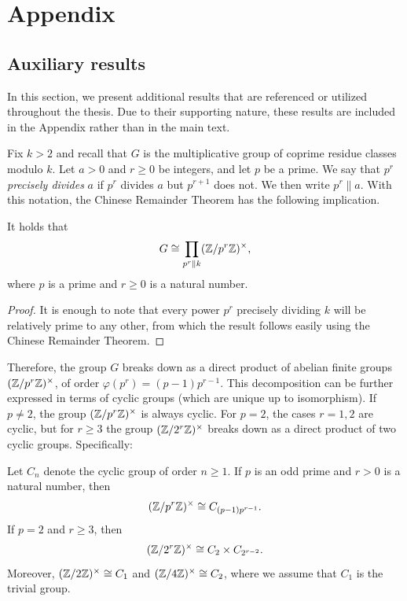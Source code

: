 \documentclass[../main.tex]{subfiles}
\begin{document}
\section{Appendix}\label{sec:appendix}

\subsection{Auxiliary results}\label{sec:extraresults}

In this section, we present additional results that are referenced or utilized throughout the thesis. Due to their supporting nature, these results are included in the Appendix rather than in the main text.
  
Fix $k>2$ and recall that $G$ is the multiplicative group of coprime residue classes modulo $k$. Let $a>0$ and $r\geqslant 0$ be integers, and let $p$ be a prime. We say that $p^r$ \emph{precisely divides} $a$ if $p^r$ divides $a$ but $p^{r+1}$ does not. We then write $p^r\parallel a$. With this notation, the Chinese Remainder Theorem has the following implication.
\begin{lemma}\label{lem:Gbreaks}
	It holds that
	\begin{equation*}
		G\cong\prod_{p^r\parallel k}(\mathbb{Z}/p^r\mathbb{Z})^\times,
	\end{equation*}
	where $p$ is a prime and $r\geqslant 0$ is a natural number.
\end{lemma}
\begin{proof}
	It is enough to note that every power $p^r$ precisely dividing $k$ will be relatively prime to any other, from which the result follows easily using the Chinese Remainder Theorem. 
\end{proof}
Therefore, the group $G$ breaks down as a direct product of abelian finite groups $(\mathbb{Z}/p^r\mathbb{Z})^\times$, of order $\varphi(p^r)=(p-1)p^{r-1}$. This decomposition can be further expressed in terms of cyclic groups (which are unique up to isomorphism). If $p\neq 2$, the group $(\mathbb{Z}/p^r\mathbb{Z})^\times$ is always cyclic. For $p=2$, the cases $r=1, 2$ are cyclic, but for $r\geqslant 3$ the group $(\mathbb{Z}/2^r\mathbb{Z})^\times$ breaks down as a direct product of two cyclic groups. Specifically:
\begin{lemma}\label{lemma:cyclicgroups}
	Let $C_n$ denote the cyclic group of order $n\geqslant 1$. If $p$ is an odd prime and $r > 0$ is a natural number, then 
	\begin{equation}\label{eq:cyclicgroups1}
		(\mathbb{Z}/p^r\mathbb{Z})^\times\cong C_{(p-1)p^{r-1}}.
	\end{equation}
	If $p=2$ and $r\geqslant 3$, then 
	\begin{equation}\label{eq:cyclicgroups2}
		(\mathbb{Z}/2^r\mathbb{Z})^\times\cong C_2\times C_{2^{r-2}}.
	\end{equation}
	Moreover, $(\mathbb{Z}/2\mathbb{Z})^\times\cong C_1$ and $(\mathbb{Z}/4\mathbb{Z})^\times\cong C_2$, where we assume that $C_1$ is the trivial group.
\end{lemma}
\end{document}
